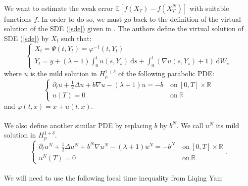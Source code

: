 \documentclass{article}[12pt]
\newcommand{\R}{\mathbb{R}}
\newcommand{\E}{\mathbb{E}}
\newcommand{\di}{\mathrm{d}}
\begin{document}
        \paragraph{}
        We want to estimate the weak error $\E\left[f\left(X_T\right)-f\left(X_T^N\right)\right]$ with suitable functions $f$. In order to do so, we must go back to the definition of the virtual solution of the SDE (\ref{sde}) given in \cite{Fla-Iss-Rus-2017}. The authors define the virtual solution of SDE (\ref{sde}) by $X_t$ such that:
        \begin{equation}
        \begin{cases}
        X_t = \Psi(t,Y_t) = \varphi^{-1}(t,Y_t)
        \\
        Y_t = y + (\lambda+1)\int_0^t u(s,Y_s)\ \di s +\int_0^t (\nabla u(s,Y_s)+1)\ \di W_s
        \end{cases}
        \end{equation}
        where $u$ is the mild solution in $H_p^{1+\delta}$ of the following parabolic PDE:
        \begin{equation}\label{pde}
        \begin{cases}
        \partial_t u + \frac{1}{2}\Delta u + b\nabla u - (\lambda+1)u = -b\ &\mathrm{on}\ [0,T]\times\R\\
        u(T) = 0\ &\mathrm{on}\ \R
        \end{cases}
        \end{equation}
        and $\varphi(t,x) = x + u(t,x)$.
        
        \paragraph{}
        We also define another similar PDE by replacing $b$ by $b^N$. We call $u^N$ its mild solution in $H_p^{1+\delta}$.
        \begin{equation}\label{pde2}
        \begin{cases}
        \partial_t u^N + \frac{1}{2}\Delta u^N + b^N\nabla u^N - (\lambda+1)u^N = -b^N\ &\mathrm{on}\ [0,T]\times\R\\
        u^N(T) = 0\ &\mathrm{on}\ \R
        \end{cases}.
        \end{equation}
        
        \paragraph{}
        We will need to use the following local time inequality from Liqing Yan:
        
\end{document}

